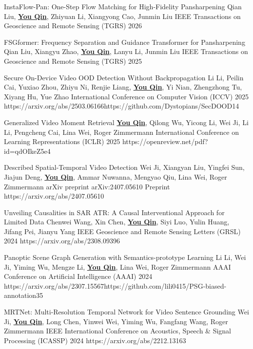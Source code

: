   \cvPub
    {InstaFlow-Pan: One-Step Flow Matching for High-Fidelity Pansharpening}
    {Qian Liu, \underline{\textbf{You Qin}}, Zhiyuan Li, Xiangyong Cao, Junmin Liu}
    {IEEE Transactions on Geoscience and Remote Sensing (TGRS) 2026}
    {}
    {}{}{}{}{}

  \cvPub
    {FSGformer: Frequency Separation and Guidance Transformer for Pansharpening}
    {Qian Liu, Xiangyu Zhao, \underline{\textbf{You Qin}}, Lanyu Li, Junmin Liu}
    {IEEE Transactions on Geoscience and Remote Sensing (TGRS) 2025}
    {}
    {}{}{}{}{}

  \cvPub
    {Secure On-Device Video OOD Detection Without Backpropagation}
    {Li Li, Peilin Cai, Yuxiao Zhou, Zhiyu Ni, Renjie Liang, \underline{\textbf{You Qin}}, Yi Nian, Zhengzhong Tu, Xiyang Hu, Yue Zhao}
    {International Conference on Computer Vision (ICCV) 2025}
    {}
    {https://arxiv.org/abs/2503.06166}{https://github.com/Dystopians/SecDOOD}{}{}{14}

  \cvPub
    {Generalized Video Moment Retrieval}
    {\underline{\textbf{You Qin}}, Qilong Wu, Yicong Li, Wei Ji, Li Li, Pengcheng Cai, Lina Wei, Roger Zimmermann}
    {International Conference on Learning Representations (ICLR) 2025}
    {}
    {https://openreview.net/pdf?id=qdOIkeZ5e4}{}{}{}{}

  \cvPub
    {Described Spatial-Temporal Video Detection}
    {Wei Ji, Xiangyan Liu, Yingfei Sun, Jiajun Deng, \underline{\textbf{You Qin}}, Ammar Nuwanna, Mengyao Qiu, Lina Wei, Roger Zimmermann}
    {arXiv preprint arXiv:2407.05610}
    {Preprint}
    {https://arxiv.org/abs/2407.05610}{}{}{}{}

  \cvPub
    {Unveiling Causalities in SAR ATR: A Causal Interventional Approach for Limited Data}
    {Chenwei Wang, Xin Chen, \underline{\textbf{You Qin}}, Siyi Luo, Yulin Huang, Jifang Pei, Jianyu Yang}
    {IEEE Geoscience and Remote Sensing Letters (GRSL) 2024}
    {}
    {https://arxiv.org/abs/2308.09396}{}{}{}{}

  \cvPub
    {Panoptic Scene Graph Generation with Semantics-prototype Learning}
    {Li Li, Wei Ji, Yiming Wu, Mengze Li, \underline{\textbf{You Qin}}, Lina Wei, Roger Zimmermann}
    {AAAI Conference on Artificial Intelligence (AAAI) 2024}
    {}
    {https://arxiv.org/abs/2307.15567}{https://github.com/lili0415/PSG-biased-annotation}{}{}{35}

  \cvPub
    {MRTNet: Multi-Resolution Temporal Network for Video Sentence Grounding}
    {Wei Ji, \underline{\textbf{You Qin}}, Long Chen, Yinwei Wei, Yiming Wu, Fangfang Wang, Roger Zimmermann}
    {IEEE International Conference on Acoustics, Speech \& Signal Processing (ICASSP) 2024}
    {}
    {https://arxiv.org/abs/2212.13163}{}{}{}{}

